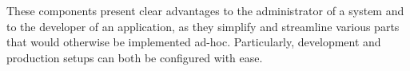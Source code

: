 \documentclass{sig-alternate}
\begin{document}
These components present clear advantages to the administrator of a system and to the developer of an application, as they simplify and streamline various parts that would otherwise be implemented ad-hoc. Particularly, development and production setups can both be configured with ease.


\end{document}
